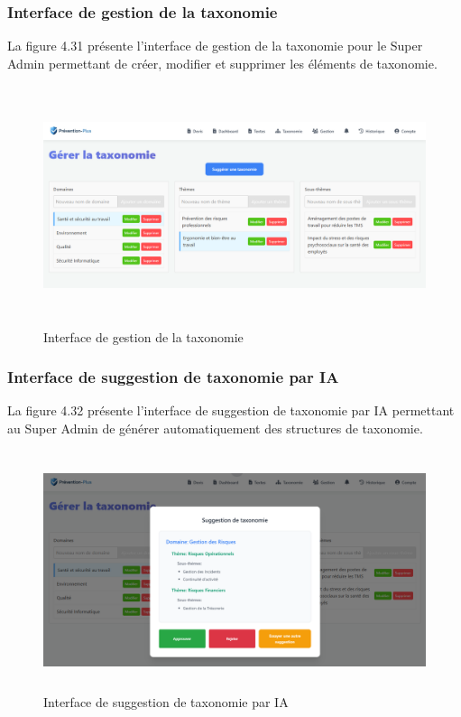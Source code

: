 \subsubsection{Interface de gestion de la taxonomie}
\noindent La figure 4.31 présente l'interface de gestion de la taxonomie pour le Super Admin permettant de créer, modifier et supprimer les éléments de taxonomie.

\begin{figure}[H]
    \centering
    \includegraphics[width=14cm,height=7cm]{images/gestiontaxonomy.PNG}
    \caption{Interface de gestion de la taxonomie}
\end{figure}

\subsubsection{Interface de suggestion de taxonomie par IA}
\noindent La figure 4.32 présente l'interface de suggestion de taxonomie par IA permettant au Super Admin de générer automatiquement des structures de taxonomie.

\begin{figure}[H]
    \centering
    \includegraphics[width=13cm,height=7cm]{images/suggestiontaxonomy.PNG}
    \caption{Interface de suggestion de taxonomie par IA}
\end{figure}

